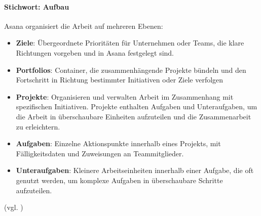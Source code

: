\documentclass[sigconf, nonacm]{acmart}
\begin{document}
\paragraph{Stichwort: Aufbau}
Asana organisiert die Arbeit auf mehreren Ebenen:
\begin{itemize}
\item \textbf{Ziele}: Übergeordnete Prioritäten für Unternehmen oder Teams, die klare Richtungen vorgeben und in Asana festgelegt sind.
\item \textbf{Portfolios}: Container, die zusammenhängende Projekte bündeln und den Fortschritt in Richtung bestimmter Initiativen oder Ziele verfolgen
\item \textbf{Projekte}: Organisieren und verwalten Arbeit im Zusammenhang mit spezifischen Initiativen. Projekte enthalten Aufgaben und Unteraufgaben, um die Arbeit in überschaubare Einheiten aufzuteilen und die Zusammenarbeit zu erleichtern.
\item \textbf{Aufgaben}: Einzelne Aktionspunkte innerhalb eines Projekts, mit Fälligkeitsdaten und Zuweisungen an Teammitglieder.
\item \textbf{Unteraufgaben}: Kleinere Arbeitseinheiten innerhalb einer Aufgabe, die oft genutzt werden, um komplexe Aufgaben in überschaubare Schritte aufzuteilen.
\end{itemize}
(vgl. \citep{noauthor_mit_nodate})
\end{document}
